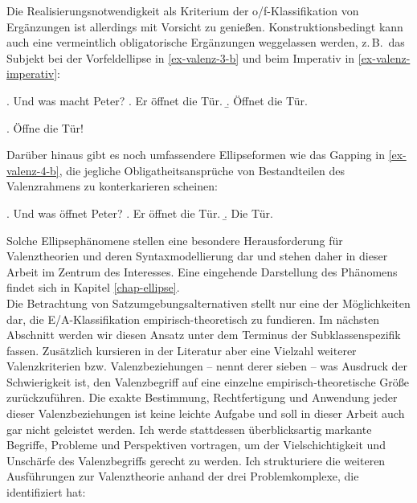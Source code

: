 Die Realisierungsnotwendigkeit als Kriterium der o/f-Klassifikation von Ergänzungen ist allerdings mit Vorsicht zu genießen. Konstruktionsbedingt kann auch eine vermeintlich obligatorische Ergänzungen weggelassen werden, z.\,B.\ das Subjekt bei der Vorfeldellipse in \ref{ex-valenz-3-b} und beim Imperativ in \ref{ex-valenz-imperativ}:

\ex. Und was macht Peter? 
\a. Er öffnet die Tür.
\b. Öffnet die Tür.  \label{ex-valenz-3-b}

\ex. Öffne die Tür!\label{ex-valenz-imperativ}

Darüber hinaus gibt es noch umfassendere Ellipseformen wie das Gapping in \ref{ex-valenz-4-b}, die jegliche Obligatheitsansprüche von Bestandteilen des Valenzrahmens zu konterkarieren scheinen:

\ex. Und was öffnet Peter? 
\a. Er öffnet die Tür.
\b. Die Tür. \label{ex-valenz-4-b}

Solche Ellipsephänomene stellen eine besondere Herausforderung für Valenztheorien und deren Syntaxmodellierung dar und stehen daher in dieser Arbeit im Zentrum des  Interesses. Eine eingehende Darstellung des Phänomens findet sich in Kapitel \ref{chap-ellipse}. \\

Die Betrachtung von Satzumgebungsalternativen stellt nur eine der Möglichkeiten dar, die E/A-Klassifikation empirisch-theoretisch zu fundieren. Im nächsten Abschnitt werden wir diesen Ansatz unter dem Terminus der Subklassenspezifik fassen. Zusätzlich kursieren in der Literatur aber eine Vielzahl weiterer Valenzkriterien bzw. Valenzbeziehungen -- \cite{Jacobs:94} nennt derer sieben -- was Ausdruck der Schwierigkeit ist, den Valenzbegriff auf eine einzelne empirisch-theoretische Grö\ss e zurückzuführen. Die exakte Bestimmung, Rechtfertigung und Anwendung jeder dieser Valenzbeziehungen ist keine leichte Aufgabe und soll in dieser Arbeit auch gar nicht geleistet werden. Ich werde stattdessen überblicksartig markante Begriffe, Probleme und Perspektiven vortragen, um der Vielschichtigkeit und Unschärfe des Valenzbegriffs gerecht zu werden. Ich strukturiere die weiteren Ausführungen zur Valenztheorie anhand der drei Problemkomplexe, die \citet[23]{Storrer:92} identifiziert hat: 

